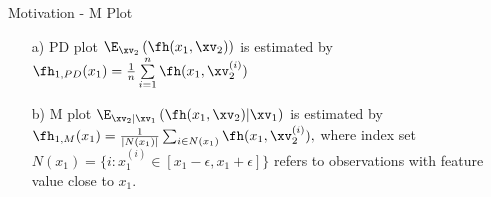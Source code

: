 \documentclass[11pt,compress,t,notes=noshow, aspectratio=169, xcolor=table]{beamer}
\begin{document}
\begin{frame}{Motivation - M Plot}
\begin{enumerate}
\item[a)] PD plot $\E_{\xv_2} \left( \fh(x_1, \xv_2) \right)$ is estimated by $ \fh_{1, PD}(x_1) = \frac{1}{n} \sum\limits_{i=1}^n \fh(x_1, \xv_2^{(i)})$
\item[b)] M plot $\E_{\xv_2|\xv_1} \left( \fh(x_1, \xv_2) \middle| \xv_1\right)$ is
estimated by $\fh_{1, M}(x_1) = \textstyle\frac{1}{|N(x_1)|} \sum_{i \in N(x_1)} \fh(x_1, \xv_2^{(i)}),$
where index set $N(x_1) = \{i: x_1^{(i)} \in [x_1 - \epsilon, x_1 + \epsilon]\}$ refers to observations with feature value close to $x_1$. %
\end{enumerate}
\end{frame}
\end{document}
